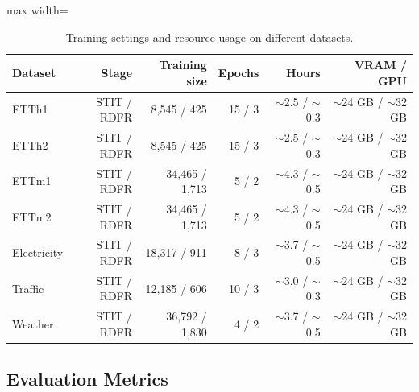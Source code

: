 \begin{table}[htbp]\centering\small
\caption{Training settings and resource usage on different datasets.}\label{tab:training_resource}
\setlength{\tabcolsep}{4pt}\renewcommand{\arraystretch}{1.25}
\begin{adjustbox}{max width=\linewidth}\begin{tabular}{lrrrrr}\toprule
\textbf{Dataset} & \textbf{Stage} & \textbf{Training size} & \textbf{Epochs} & \textbf{Hours} & \textbf{VRAM / GPU}\\\midrule
ETTh1 & STIT / RDFR & 8,545 / 425 & 15 / 3 & $\sim$2.5 / $\sim$0.3 & $\sim$24 GB / $\sim$32 GB\\
ETTh2 & STIT / RDFR & 8,545 / 425 & 15 / 3 & $\sim$2.5 / $\sim$0.3 & $\sim$24 GB / $\sim$32 GB\\
ETTm1 & STIT / RDFR & 34,465 / 1,713 & 5 / 2 & $\sim$4.3 / $\sim$0.5 & $\sim$24 GB / $\sim$32 GB\\
ETTm2 & STIT / RDFR & 34,465 / 1,713 & 5 / 2 & $\sim$4.3 / $\sim$0.5 & $\sim$24 GB / $\sim$32 GB\\
Electricity & STIT / RDFR & 18,317 / 911 & 8 / 3 & $\sim$3.7 / $\sim$0.5 & $\sim$24 GB / $\sim$32 GB\\
Traffic & STIT / RDFR & 12,185 / 606 & 10 / 3 & $\sim$3.0 / $\sim$0.3 & $\sim$24 GB / $\sim$32 GB\\
Weather & STIT / RDFR & 36,792 / 1,830 & 4 / 2 & $\sim$3.7 / $\sim$0.5 & $\sim$24 GB / $\sim$32 GB\\
\bottomrule\end{tabular}\end{adjustbox}\end{table}

\subsection{Evaluation Metrics}

